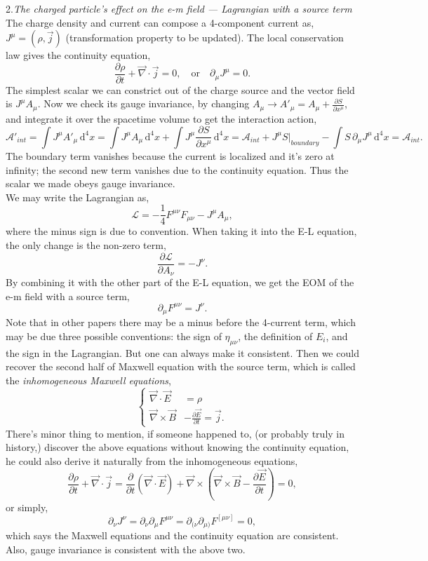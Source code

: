\documentclass{article}
\newcommand{\be}{\begin{equation}}
\newcommand{\ee}{\end{equation}}
\newcommand{\dif}{\,\mathrm{d}}
\newcommand{\p}{\partial}
\newcommand{\1}{\left}
\newcommand{\2}{\right}
\newcommand{\ma}{\mathcal}
\newcommand{\m}{\mu}
\newcommand{\n}{\nu}
\begin{document}
2.\textsl{The charged particle's effect on the e-m field --- Lagrangian with a source term}\\

The charge density and current can compose a 4-component current as, $J^\m=(\rho,\vec j)$ (transformation property to be updated). The local conservation law gives the continuity equation,
\be
\frac{\p\rho}{\p t}+\vec\nabla\cdot\vec j=0,\quad \text{or} \quad \p_\m J^\m=0.
\ee
The simplest scalar we can constrict out of the charge source and the vector field is $J^\m A_\m$. Now we check its gauge invariance, by changing $A_\m\rightarrow A'_\m=A_\m+\frac{\p S}{\p x^\m}$, and integrate it over the spacetime volume to get the interaction action,
\be
\ma A'_{int} = \int J^\m A'_\m \dif^4 x = \int J^\m A_\m \dif^4 x + \int J^\m \frac{\p S}{\p x^\m} \dif^4 x
=\ma A_{int} + J^\m S|_{boundary} - \int S\, \p_\m J^\m \dif^4 x =\ma A_{int}.
\ee
The boundary term vanishes because the current is localized and it's zero at infinity; the second new term vanishes due to the continuity equation. Thus the scalar we made obeys gauge invariance.\\
We may write the Lagrangian as,
\be
\ma L= -\frac1 4 F^{\m\n}F_{\m\n} - J^\m A_\m,
\ee
where the minus sign is due to convention. When taking it into the E-L equation, the only change is the non-zero term,
\be
\frac{\p \ma L}{\p A_\n}=-J^\n.
\ee
By combining it with the other part of the E-L equation, we get the EOM of the e-m field with a source term,
\be
\p_\m F^{\m\n} = J^\n.
\ee
Note that in other papers there may be a minus before the 4-current term, which may be due three possible conventions: the sign of $\eta_{\m\n}$, the definition of $E_i$, and the sign in the Lagrangian. But one can always make it consistent.
Then we could recover the second half of Maxwell equation with the source term, which is called the \textit{inhomogeneous Maxwell equations},
\be 
\1\{
\begin{split}
\vec\nabla\cdot\vec E&=\rho\\
\vec\nabla\times\vec B &- \frac{\p\vec E}{\p t}=\vec j.
\end{split}
\2.
\ee
There's minor thing to mention, if someone happened to, (or probably truly in history,) discover the above equations without knowing the continuity equation, he could also derive it naturally from the inhomogeneous equations,
\be
\frac{\p\rho}{\p t}+\vec\nabla\cdot\vec j=\frac\p{\p t}(\vec\nabla\cdot\vec E)+\vec\nabla\times(\vec\nabla\times\vec B - \frac{\p\vec E}{\p t})=0, 
\ee
or simply,
\be
\p_\n J^\n=\p_\n\p_\m F^{\m\n} = \p_{(\n}\p_{\m)} F^{[\m\n]}= 0,
\ee
which says the Maxwell equations and the continuity equation are consistent. Also, gauge invariance is consistent with the above two.
\end{document}
